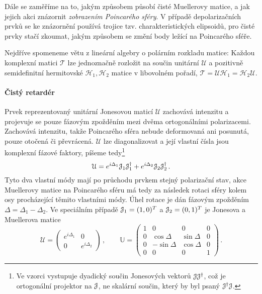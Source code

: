 Dále se zaměříme na to, jakým způsobem působí čisté Muellerovy matice, a jak jejich akci znázornit \emph{zobrazením Poincarého sféry}\cite{gilReviewMuellerMatrix2014,ossikovskiPoincareSphereMapping2013}.
V případě depolarizačních prvků se ke znázornění používá trojice tzv. charakteristických elipsoidů, pro čisté prvky stačí zkoumat, jakým způsobem se změní body ležící na Poincarého sféře.

Nejdříve spomeneme větu z lineární algebry o polárním rozkladu matice\cite{motlPestujemeLinearniAlgebru2002}: Každou komplexní matici $\mathcal{T}$ lze jednoznačně rozložit na součin unitární $\mathcal{U}$ a pozitivně semidefinitní hermitovské $\mathcal{H}_1, \mathcal{H}_2$ matice v libovolném pořadí, $\mathcal{T}=\mathcal{U}\mathcal{H}_1 = \mathcal{H}_2 \mathcal{U}$.

\paragraph{Čistý retardér}

Prvek reprezentovaný unitární Jonesovou maticí $\mathcal{U}$ zachovává intenzitu a projevuje se pouze fázovým zpožděním mezi dvěma ortogonálními polarizacemi.
Zachovává intenzitu, takže Poincarého sféra nebude deformovaná ani posunutá, pouze otočená či převrácená.
$\mathcal{U}$ lze diagonalizovat a její vlastní čísla jsou komplexní fázové faktory, píšeme tedy\footnote{Ve vzorci vystupuje dyadický součin Jonesových vektorů $\mathcal{J}\mathcal{J}^\dagger$, což je ortogonální projektor na $\mathcal{J}$, ne skalární součin, který by byl psaný $\mathcal{J}^\dagger \mathcal{J}$.}
\begin{equation}
    \mathcal{U}=e^{i\Delta_1} \mathcal{J}_1 \mathcal{J}_1^\dagger + e^{i\Delta_2} \mathcal{J}_2 \mathcal{J}_2^\dagger\,.
\end{equation}
Tyto dva vlastní módy mají po průchodu prvkem stejný polarizační stav, akce Muellerovy matice na Poincarého sféru má tedy za následek rotaci sféry kolem osy procházející těmito vlastními módy.
Úhel rotace je dán fázovým zpožděním $\Delta=\Delta_1-\Delta_2$.
Ve speciálním případě $\mathcal{J}_1=(1,0)^T$ a $\mathcal{J}_2=(0,1)^T$ je Jonesova a Muellerova matice
\begin{equation}
    \mathcal{U}=\begin{pmatrix}
        e^{i\Delta_1} & 0 \\ 0 & e^{i\Delta_2}
        \end{pmatrix} \,, \qquad
    \mathbb{U}=\begin{pmatrix}
        1 & 0 & 0 & 0 \\ 0 & \cos\Delta & \sin\Delta & 0 \\
        0 & -\sin\Delta & \cos\Delta & 0 \\ 0 & 0 & 0 & 1
        \end{pmatrix} \,.
\end{equation}


